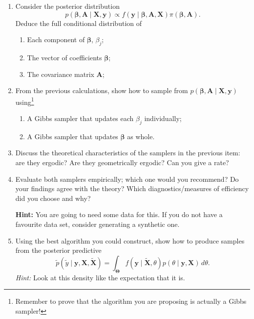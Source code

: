 \documentclass[a4paper,10pt, notitlepage]{report}
\newcommand{\bX}{ \boldsymbol{X}} %
\newcommand{\by}{ \boldsymbol{y} } %
\newcommand{\bb}{ \boldsymbol{\beta} }
\newcommand{\ba}{ \boldsymbol{A} }
\begin{document}
\begin{enumerate}
 \item Consider the posterior distribution
 \begin{equation*}
     p\left(\bb, \ba \mid \bX, \by \right) \propto f\left(\by \mid \bb, \ba, \bX \right)\pi\left(\bb, \ba\right).
 \end{equation*}
 Deduce the full conditional distribution of
 \begin{enumerate}
     \item Each component of $\bb$, $\beta_j$;
     \item The vector of coefficients $\bb$;
     \item The covariance matrix $\ba$;
 \end{enumerate}
 \item From the previous calculations, show how to sample from $p\left(\bb, \ba \mid \bX, \by \right)$ using\footnote{Remember to prove that the algorithm you are proposing is actually a Gibbs sampler!} 
 \begin{enumerate}
     \item A Gibbs sampler that updates each $\beta_j$ individually;
     \item A Gibbs sampler that updates $\bb$ as whole.
 \end{enumerate}
 \item Discuss the theoretical characteristics of the samplers in the previous item: are they ergodic? Are they geometrically ergodic? Can you give a rate?
 \item Evaluate both samplers empirically; which one would you recommend? Do your findings agree with the theory? Which diagnostics/measures of efficiency did you choose and why?

\textbf{Hint:} You are going to need some data for this.
If you do not have a favourite data set, consider generating a synthetic one.
 
 \item Using the best algorithm you could construct, show how to produce samples from the posterior predictive
\begin{equation*}
    \tilde{p}(\tilde{y} \mid \boldsymbol{y}, \bX, \tilde{\bX}) = \int_{\boldsymbol{\Theta}} f(\by \mid \tilde{\bX}, \theta) p(\theta \mid \by, \bX)\,d\theta.
\end{equation*}
 \textit{Hint:} Look at this density like the expectation that it is.
 \end{enumerate}
% 
% 
% 
\end{document}
